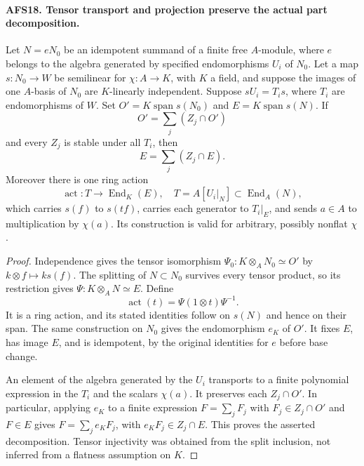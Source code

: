 \documentclass[11pt,a4paper]{article}
\numberwithin{equation}{section}
\theoremstyle{remark}\newtheorem{remark}[theorem]{Remark}
\begin{document}
\paragraph{AFS18. Tensor transport and projection preserve the actual part decomposition.}
\label{claim:AFS18}
Let $N=eN_0$ be an idempotent summand of a finite free
$A$-module, where $e$ belongs to the algebra generated
by specified endomorphisms $U_i$ of $N_0$.  Let a map
$s:N_0\to W$ be semilinear for $\chi:A\to K$, with
$K$ a field, and suppose the images of one $A$-basis of
$N_0$ are $K$-linearly independent.  Suppose
$sU_i=T_is$, where $T_i$ are endomorphisms of $W$.
Set $O'=K\operatorname{span}s(N_0)$ and
$E=K\operatorname{span}s(N)$.  If
\[
 O'=\sum_j(Z_j\cap O')
\]
and every $Z_j$ is stable under all $T_i$, then
\[
 E=\sum_j(Z_j\cap E).
\]
Moreover there is one ring action
\[
 \operatorname{act}:T\longrightarrow\operatorname{End}_K(E),
 \quad T=A[U_i|_N]\subset\operatorname{End}_A(N),
\]
which carries $s(f)$ to $s(tf)$, carries each generator
to $T_i|_E$, and sends $a\in A$ to multiplication by
$\chi(a)$.  Its construction is valid for arbitrary,
possibly nonflat $\chi$.
\begin{proof}
Independence gives the tensor isomorphism
$\Psi_0:K\otimes_A N_0\simeq O'$ by
$k\otimes f\mapsto ks(f)$.  The splitting of $N\subset N_0$
survives every tensor product, so its restriction gives
$\Psi:K\otimes_A N\simeq E$.  Define
\[
 \operatorname{act}(t)=\Psi(1\otimes t)\Psi^{-1}.
\]
It is a ring action, and its stated identities follow
on $s(N)$ and hence on their span.  The same construction
on $N_0$ gives the endomorphism $e_K$ of $O'$.  It fixes
$E$, has image $E$, and is idempotent, by the original
identities for $e$ before base change.

An element of the algebra generated by the $U_i$
transports to a finite polynomial expression in the
$T_i$ and the scalars $\chi(a)$.  It preserves each
$Z_j\cap O'$.  In particular, applying $e_K$ to a finite
expression $F=\sum_jF_j$ with $F_j\in Z_j\cap O'$ and
$F\in E$ gives
$F=\sum_je_KF_j$, with $e_KF_j\in Z_j\cap E$.
This proves the asserted decomposition.  Tensor
injectivity was obtained from the split inclusion,
not inferred from a flatness assumption on $K$.
\end{proof}

\end{document}
